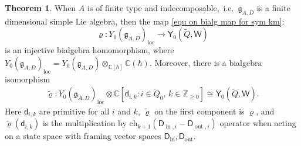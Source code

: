\documentclass[10pt]{amsart}
\theoremstyle{definition}
\newtheorem{Theorem}{Theorem}[section]
\numberwithin{equation}{section}
\newcommand{\bC}{\mathbb{C}}
\newcommand{\bZ}{\mathbb{Z}}
\newcommand{\loc}{\mathrm{loc}}
\newcommand{\sW}{\mathsf{W}}
\newcommand{\In}{\operatorname{in}}
\newcommand{\Out}{\operatorname{out}}
\begin{document}
\begin{Theorem}\label{thm on copr compa}
When $A$ is of finite type and indecomposable,~i.e.~$\mathfrak{g}_{A,D}$ is a finite dimensional simple Lie algebra, then the map 
\eqref{equ on bialg map for sym km}:
$$\varrho\colon Y_{0}(\mathfrak{g}_{A,D})_{\loc}\to \mathsf Y_0(\widetilde{Q},\sW)$$
is an injective bialgebra homomorphism, where $Y_{0}(\mathfrak{g}_{A,D})_{\loc}=Y_{0}(\mathfrak{g}_{A,D})\otimes_{\bC[\hbar]}\bC(\hbar)$. Moreover, there is a bialgebra isomorphism
\begin{align*}
\widetilde{\varrho}\colon Y_{0}(\mathfrak{g}_{A,D})_{\loc}\otimes \bC[\mathsf d_{i,k}: i\in \widetilde{Q}_0,\, k\in \bZ_{\geqslant 0}]\cong \mathsf Y_0(\widetilde{Q},\sW).
\end{align*}
Here $\mathsf d_{i,k}$ are primitive for all $i$ and $k$, $\widetilde{\varrho}$ on the first component is $\varrho$, and $\widetilde{\varrho}(\mathsf d_{i,k})$ is the multiplication by $\mathrm{ch}_{k+1}(\mathsf D_{\In,i}-\mathsf D_{\Out,i})$ operator when acting on a state space with framing vector spaces $\mathsf D_{\In}, \mathsf D_{\Out}$.
\end{Theorem}
\end{document}
